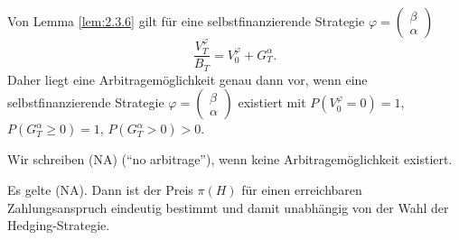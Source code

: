 \documentclass[a4paper,twoside,DIV15,BCOR12mm]{scrbook}
\begin{document}
\begin{bemerkung}
Von Lemma \ref{lem:2.3.6} gilt für eine selbstfinanzierende Strategie $\varphi = 
\left(\begin{smallmatrix} \beta \\ \alpha \end{smallmatrix}\right)$
\[
\frac{V_T^\varphi}{B_{T}} = V_0^\varphi + G_T^\alpha.
\]
Daher liegt eine Arbitragemöglichkeit genau dann vor, wenn eine selbstfinanzierende Strategie \mbox{$\varphi = 
\left(\begin{smallmatrix} \beta \\ \alpha \end{smallmatrix}\right)$} existiert mit $P(V_0^\varphi = 0) = 1$, $P(G_T^\alpha \ge 0) = 1$, $P(G_T^\alpha>0)>0$.
\end{bemerkung}

\begin{bemerkung}
Wir schreiben (NA) (“no arbitrage”), wenn keine Arbitragemöglichkeit existiert.
\end{bemerkung}

\begin{lemma}
Es gelte (NA). Dann ist der Preis $\pi(H)$ für einen erreichbaren Zahlungsanspruch eindeutig bestimmt und damit unabhängig von der Wahl der Hedging-Strategie.
\end{lemma}
\end{document}
